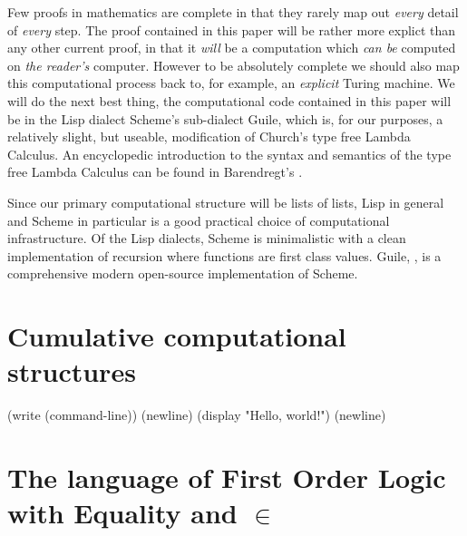 \documentclass[a4paper,openany]{amsart}
\begin{document}
Few proofs in mathematics are complete in that they rarely map out \emph{every}
detail of \emph{every} step. The proof contained in this paper will be rather
more explict than any other current proof, in that it \emph{will} be a
computation which \emph{can be} computed on \emph{the reader's} computer.
However to be absolutely complete we should also map this computational process
back to, for example, an \emph{explicit} Turing machine. We will do the next
best thing, the computational code contained in this paper will be in the Lisp
dialect Scheme's sub-dialect Guile, which is, for our purposes, a relatively
slight, but useable, modification of Church's type free Lambda Calculus. An
encyclopedic introduction to the syntax and semantics of the type free Lambda
Calculus can be found in Barendregt's \cite{barendregt2012lambdaCalculus}.

Since our primary computational structure will be lists of lists, Lisp in
general and Scheme in particular is a good practical choice of computational
infrastructure. Of the Lisp dialects, Scheme is minimalistic with a clean
implementation of recursion where functions are first class values. Guile,
\cite{guile2014online, guile2014reference}, is a comprehensive modern
open-source implementation of Scheme.

\section{Cumulative computational structures}

\begin{guile}
(write (command-line))
(newline)
(display "Hello, world!")
(newline)
\end{guile}

\section{The language of First Order Logic with Equality and $\in$}

\printbibliography
\end{document}
